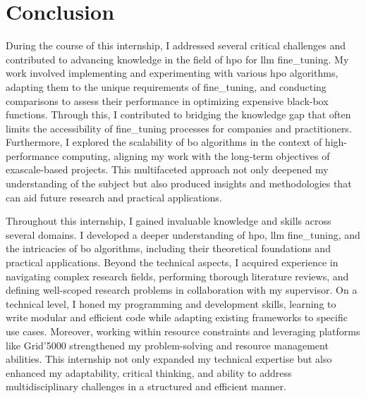 \chapter*{Conclusion}
\label{chap:conclusion}



During the course of this internship, I addressed several critical challenges and contributed to advancing knowledge in the field of \acrlong{hpo} for \acrlong{llm} \gls{fine_tuning}. My work involved implementing and experimenting with various \acrlong{hpo} algorithms, adapting them to the unique requirements of \gls{fine_tuning}, and conducting comparisons to assess their performance in optimizing expensive black-box functions. Through this, I contributed to bridging the knowledge gap that often limits the accessibility of \gls{fine_tuning} processes for companies and practitioners. Furthermore, I explored the scalability of \acrlong{bo} algorithms in the context of high-performance computing, aligning my work with the long-term objectives of exascale-based projects. This multifaceted approach not only deepened my understanding of the subject but also produced insights and methodologies that can aid future research and practical applications.


Throughout this internship, I gained invaluable knowledge and skills across several domains. I developed a deeper understanding of \acrlong{hpo}, \acrlong{llm} \gls{fine_tuning}, and the intricacies of \acrlong{bo} algorithms, including their theoretical foundations and practical applications. Beyond the technical aspects, I acquired experience in navigating complex research fields, performing thorough literature reviews, and defining well-scoped research problems in collaboration with my supervisor. On a technical level, I honed my programming and development skills, learning to write modular and efficient code while adapting existing frameworks to specific use cases. Moreover, working within resource constraints and leveraging platforms like Grid’5000 strengthened my problem-solving and resource management abilities. This internship not only expanded my technical expertise but also enhanced my adaptability, critical thinking, and ability to address multidisciplinary challenges in a structured and efficient manner.




